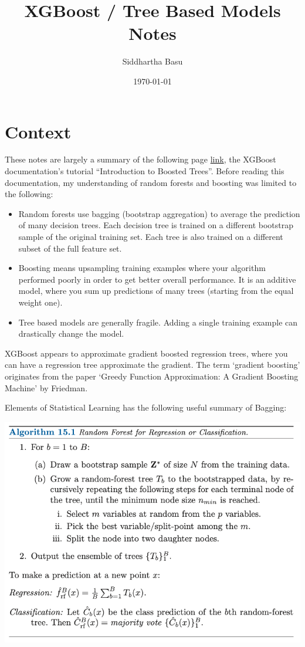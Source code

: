 \documentclass[12 pt, leqno]{article}
\begin{document}
\title{XGBoost / Tree Based Models Notes}
\author{Siddhartha Basu}
\date{\today}
\maketitle
\tableofcontents

\section{Context}

These notes are largely a summary of the following page \href{https://xgboost.readthedocs.io/en/stable/tutorials/model.html}{link}, the XGBoost documentation's tutorial ``Introduction to Boosted Trees''. Before reading this documentation, my understanding of random forests and boosting was limited to the following:

\begin{itemize}
\item Random forests use bagging (bootstrap aggregation) to average the prediction of many decision trees. Each decision tree is trained on a different bootstrap sample of the original training set. Each tree is also trained on a different subset of the full feature set.
\item Boosting means upsampling training examples where your algorithm performed poorly in order to get better overall performance. It is an additive model, where you sum up predictions of many trees (starting from the equal weight one).
\item Tree based models are generally fragile. Adding a single training example can drastically change the model.
\end{itemize}

XGBoost appears to approximate gradient boosted regression trees, where you can have a regression tree approximate the gradient. The term `gradient boosting' originates from the paper `Greedy Function Approximation: A Gradient Boosting Machine' by Friedman. 

Elements of Statistical Learning has the following useful summary of Bagging:

\includegraphics[scale=0.5]{bagging_esl}
\end{document}
